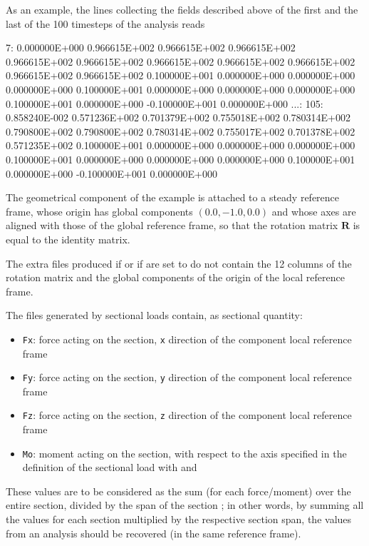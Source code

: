 As an example, the lines collecting the fields described above of the 
first and the last of the 100 timesteps of the analysis reads
\begin{inputfile}[frame=single]
  7: 0.000000E+000  0.966615E+002  0.966615E+002  0.966615E+002  0.966615E+002
     0.966615E+002  0.966615E+002  0.966615E+002  0.966615E+002  0.966615E+002
     0.966615E+002  0.100000E+001  0.000000E+000  0.000000E+000  0.000000E+000
     0.100000E+001  0.000000E+000  0.000000E+000  0.000000E+000  0.100000E+001
     0.000000E+000 -0.100000E+001  0.000000E+000
...:
105: 0.858240E-002  0.571236E+002  0.701379E+002  0.755018E+002  0.780314E+002
     0.790800E+002  0.790800E+002  0.780314E+002  0.755017E+002  0.701378E+002
     0.571235E+002  0.100000E+001  0.000000E+000  0.000000E+000  0.000000E+000
     0.100000E+001  0.000000E+000  0.000000E+000  0.000000E+000  0.100000E+001
     0.000000E+000 -0.100000E+001  0.000000E+000
\end{inputfile}
The geometrical component of the example is attached to a steady 
reference frame, whose origin has global components $( 0.0, -1.0, 0.0 )$ 
and whose axes are aligned with those of the global reference frame, so 
that the rotation matrix $\bm{R}$ is equal to the 
identity matrix.

The extra files produced if   
or if  are set to  
do not contain the 12 columns of the rotation matrix and 
the global components of the origin of the local reference frame.

The files generated by sectional loads contain, as sectional quantity:
\begin{itemize}
    \item \texttt{Fx}: force acting on the section, \texttt{x} direction 
    of the component local reference frame
    \item \texttt{Fy}: force acting on the section, \texttt{y} direction 
    of the component local reference frame
    \item \texttt{Fz}: force acting on the section, \texttt{z} direction 
    of the component local reference frame
    \item \texttt{Mo}: moment acting on the section, with respect to the 
    axis specified in the definition of the sectional load with  
    and 
\end{itemize}
These values are to be considered as the sum (for each force/moment) over the entire section,
divided by the span of the section ; in other words, by summing 
all the values for each section multiplied by the respective section span, the values from an
 analysis should be recovered (in the same reference frame).


